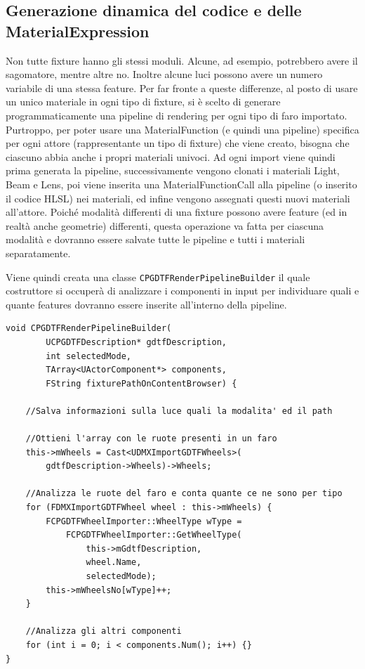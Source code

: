 \documentclass[main.tex]{subfiles}
\begin{document}
\lstset{language=UEcpp}
\subsection{Generazione dinamica del codice e delle MaterialExpression}\label{subsec:2_codeGeneration}
Non tutte fixture hanno gli stessi moduli. Alcune, ad esempio, potrebbero avere il sagomatore, mentre altre no. Inoltre alcune luci possono avere un numero variabile di una stessa feature. Per far fronte a queste differenze, al posto di usare un unico materiale in ogni tipo di fixture, si è scelto di generare programmaticamente una pipeline di rendering per ogni tipo di faro importato. Purtroppo, per poter usare una MaterialFunction (e quindi una pipeline) specifica per ogni attore (rappresentante un tipo di fixture) che viene creato, bisogna che ciascuno abbia anche i propri materiali univoci. Ad ogni import viene quindi prima generata la pipeline, successivamente vengono clonati i materiali Light, Beam e Lens, poi viene inserita una MaterialFunctionCall alla pipeline (o inserito il codice HLSL) nei materiali, ed infine vengono assegnati questi nuovi materiali all'attore. \newline
Poiché modalità differenti di una fixture possono avere feature (ed in realtà anche geometrie) differenti, questa operazione va fatta per ciascuna modalità e dovranno essere salvate tutte le pipeline e tutti i materiali separatamente. \newline

Viene quindi creata una classe \lstinline{CPGDTFRenderPipelineBuilder} il quale costruttore si occuperà di analizzare i componenti in input per individuare quali e quante features dovranno essere inserite all'interno della pipeline.
\begin{lstlisting}
void CPGDTFRenderPipelineBuilder(
        UCPGDTFDescription* gdtfDescription,
        int selectedMode,
        TArray<UActorComponent*> components,
        FString fixturePathOnContentBrowser) {

    //Salva informazioni sulla luce quali la modalita' ed il path

	//Ottieni l'array con le ruote presenti in un faro
    this->mWheels = Cast<UDMXImportGDTFWheels>(
        gdtfDescription->Wheels)->Wheels;

    //Analizza le ruote del faro e conta quante ce ne sono per tipo
	for (FDMXImportGDTFWheel wheel : this->mWheels) {
		FCPGDTFWheelImporter::WheelType wType =
            FCPGDTFWheelImporter::GetWheelType(
                this->mGdtfDescription,
                wheel.Name,
                selectedMode);
		this->mWheelsNo[wType]++;
	}

    //Analizza gli altri componenti
	for (int i = 0; i < components.Num(); i++) {}
}
\end{lstlisting}
\end{document}
